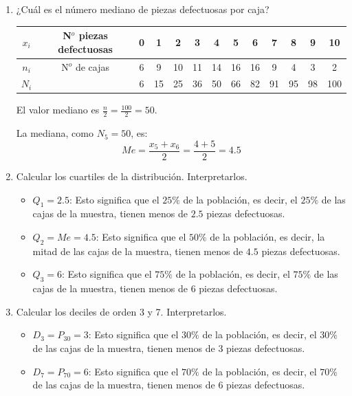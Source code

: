 \begin{ejercicio}
\begin{enumerate}
        \item ¿Cuál es el número mediano de piezas defectuosas por caja?
        \begin{table}[H]
            \centering
            \begin{tabular}{c||c||c|c|c|c|c|c|c|c|c|c|c|}
                \hline
                $x_i$ & N$^o$ piezas defectuosas & 0 & 1 & 2 & 3 & 4 & 5 & 6 & 7 & 8 & 9 & 10  \\ \hline
                $n_i$ & N$^o$ de cajas & 6 & 9 & 10 & 11 & 14 & 16 & 16 & 9 & 4 & 3 & 2 \\ \hline
                $N_i$ &  & 6 & 15 & 25 & 36 & 50 & 66 & 82 & 91 & 95 & 98 & 100 \\ \hline
            \end{tabular}
        \end{table}
        El valor mediano es $\frac{n}{2} = \frac{100}{2} = 50$.

        La mediana, como $N_5 = 50$, es:
        $$Me = \frac{x_5 + x_6}{2} = \frac{4+5}{2} = 4.5$$

        \item Calcular los cuartiles de la distribución. Interpretarlos.
        \begin{itemize}
            \item \underline{$Q_1 = 2.5$}: Esto significa que el $25\%$ de la población, es decir, el $25\%$ de las cajas de la muestra, tienen menos de $2.5$ piezas defectuosas.
            \item \underline{$Q_2 = Me = 4.5$}: Esto significa que el $50\%$ de la población, es decir, la mitad de las cajas de la muestra, tienen menos de $4.5$ piezas defectuosas.
            \item \underline{$Q_3= 6$}: Esto significa que el $75\%$ de la población, es decir, el $75\%$ de las cajas de la muestra, tienen menos de $6$ piezas defectuosas.
        \end{itemize}

        \item Calcular los deciles de orden 3 y 7. Interpretarlos.
        \begin{itemize}
            \item \underline{$D_3 = P_{30} = 3$}: Esto significa que el $30\%$ de la población, es decir, el $30\%$ de las cajas de la muestra, tienen menos de $3$ piezas defectuosas.

            \item \underline{$D_7 = P_{70} = 6$}: Esto significa que el $70\%$ de la población, es decir, el $70\%$ de las cajas de la muestra, tienen menos de $6$ piezas defectuosas.
        \end{itemize}


\end{enumerate}
\end{ejercicio}
